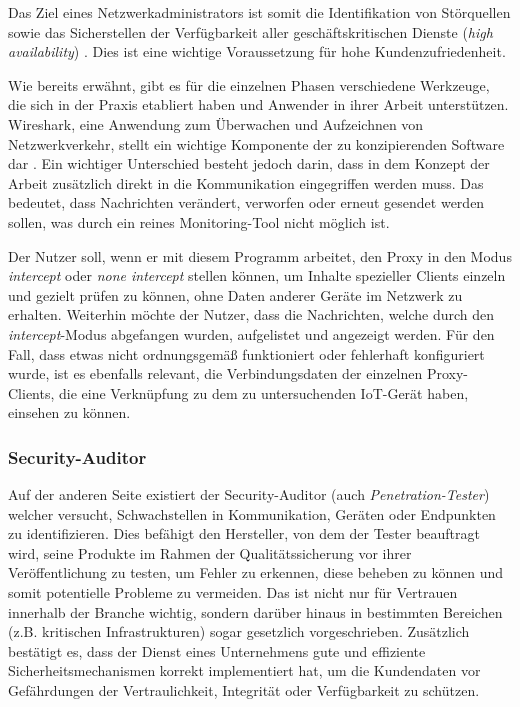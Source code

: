     Das Ziel eines Netzwerkadministrators ist somit die Identifikation von Störquellen sowie das Sicherstellen der Verfügbarkeit aller geschäftskritischen Dienste (\emph{high availability}) \cite{burgess2004principles}. Dies ist eine wichtige Voraussetzung für hohe Kundenzufriedenheit.
    
    Wie bereits erwähnt, gibt es für die einzelnen Phasen verschiedene Werkzeuge, die sich in der Praxis etabliert haben und Anwender in ihrer Arbeit unterstützen.
    Wireshark, eine Anwendung zum Überwachen und Aufzeichnen von Netzwerkverkehr, stellt ein wichtige Komponente der zu konzipierenden Software dar \cite{SandersChris2017Ppa}. Ein wichtiger Unterschied besteht jedoch darin, dass in dem Konzept der Arbeit zusätzlich direkt in die Kommunikation eingegriffen werden muss. Das bedeutet, dass Nachrichten verändert, verworfen oder erneut gesendet werden sollen, was durch ein reines Monitoring-Tool nicht möglich ist.
    
    Der Nutzer soll, wenn er mit diesem Programm arbeitet, den Proxy in den Modus \emph{intercept} oder \emph{none intercept} stellen können, um Inhalte spezieller Clients einzeln und gezielt prüfen zu können, ohne Daten anderer Geräte im Netzwerk zu erhalten.
    Weiterhin möchte der Nutzer, dass die Nachrichten, welche durch den \emph{intercept}-Modus abgefangen wurden, aufgelistet und angezeigt werden.
    Für den Fall, dass etwas nicht ordnungsgemäß funktioniert oder fehlerhaft konfiguriert wurde, ist es ebenfalls relevant, die Verbindungsdaten der einzelnen Proxy-Clients, die eine Verknüpfung zu dem zu untersuchenden \acs{IoT}-Gerät haben, einsehen zu können.
    
\subsubsection{Security-Auditor}
    Auf der anderen Seite existiert der Security-Auditor (auch \emph{Penetration-Tester}) welcher versucht, Schwachstellen in Kommunikation, Geräten oder Endpunkten zu identifizieren.
    Dies befähigt den Hersteller, von dem der Tester beauftragt wird, seine Produkte im Rahmen der Qualitätssicherung vor ihrer Veröffentlichung zu testen, um Fehler zu erkennen, diese beheben zu können und somit potentielle Probleme zu vermeiden. Das ist nicht nur für Vertrauen innerhalb der Branche wichtig, sondern darüber hinaus in bestimmten Bereichen (z.B. kritischen Infrastrukturen) sogar gesetzlich vorgeschrieben.
    Zusätzlich bestätigt es, dass der Dienst eines Unternehmens gute und effiziente Sicherheitsmechanismen korrekt implementiert hat, um die Kundendaten vor Gefährdungen der Vertraulichkeit, Integrität oder Verfügbarkeit zu schützen.
    

